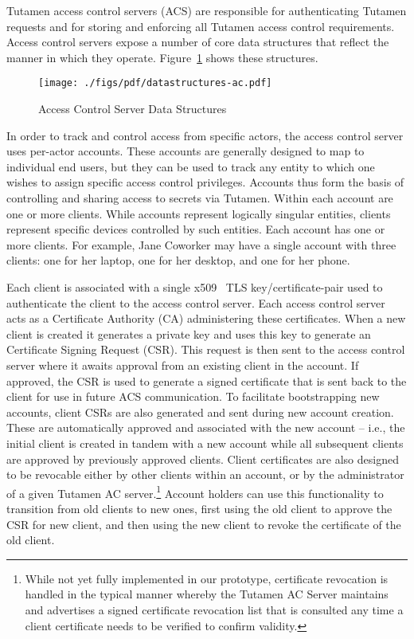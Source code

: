 Tutamen access control servers (ACS) are responsible for
authenticating Tutamen requests and for storing and enforcing all
Tutamen access control requirements. Access control servers expose a
number of core data structures that reflect the manner in which they
operate. Figure~\ref{fig:tutamen:acstructs} shows these structures.

\begin{figure}[thb]
  \centering
  \texttt{[image: ./figs/pdf/datastructures-ac.pdf]}
  \caption{Access Control Server Data Structures}
  \label{fig:tutamen:acstructs}
\end{figure}

In order to track and control access from specific actors, the access
control server uses per-actor accounts. These accounts are generally
designed to map to individual end users, but they can be used to track
any entity to which one wishes to assign specific access control
privileges. Accounts thus form the basis of controlling and sharing
access to secrets via Tutamen. Within each account are one or more
clients. While accounts represent logically singular entities, clients
represent specific devices controlled by such entities. Each account
has one or more clients. For example, Jane Coworker may have a single
account with three clients: one for her laptop, one for her desktop,
and one for her phone.

Each client is associated with a single x509~\cite{rfc5280} TLS
key/certificate-pair used to authenticate the client to the access
control server. Each access control server acts as a Certificate
Authority (CA) administering these certificates. When a new client is
created it generates a private key and uses this key to generate an
Certificate Signing Request (CSR). This request is then sent to the
access control server where it awaits approval from an existing client
in the account. If approved, the CSR is used to generate a signed
certificate that is sent back to the client for use in future ACS
communication. To facilitate bootstrapping new accounts, client CSRs
are also generated and sent during new account creation. These are
automatically approved and associated with the new account -- i.e.,
the initial client is created in tandem with a new account while all
subsequent clients are approved by previously approved clients. Client
certificates are also designed to be revocable either by other clients
within an account, or by the administrator of a given Tutamen AC
server.\footnote{While not yet fully implemented in our prototype,
  certificate revocation is handled in the typical manner whereby the
  Tutamen AC Server maintains and advertises a signed certificate
  revocation list that is consulted any time a client certificate
  needs to be verified to confirm validity.} Account holders can use
this functionality to transition from old clients to new ones, first
using the old client to approve the CSR for new client, and then using
the new client to revoke the certificate of the old client.

